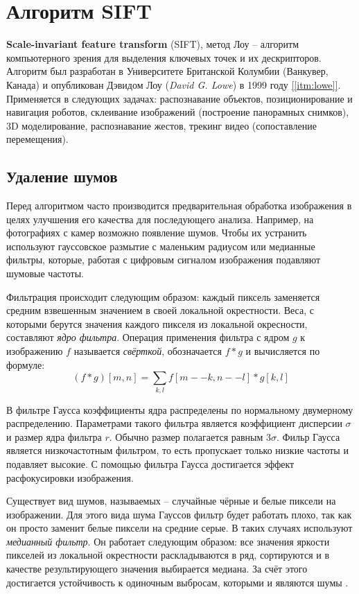 \section{Алгоритм SIFT}

\textbf{Scale-invariant feature transform} (SIFT), метод Лоу -- алгоритм компьютерного зрения для выделения ключевых точек и их дескрипторов. Алгоритм был разработан в Университете Британской Колумбии (Ванкувер, Канада) и опубликован Дэвидом Лоу (\textit{David G. Lowe}) в 1999 году \hyperref[itm:lowe]{[\ref{itm:lowe}]}. Применяется в следующих задачах: распознавание объектов, позиционирование и навигация роботов, склеивание изображений (построение панорамных снимков), 3D моделирование, распознавание жестов, трекинг видео (сопоставление перемещения).

\subsection{Удаление шумов}

Перед алгоритмом часто производится предварительная обработка изображения в целях улучшения его качества для последующего анализа. Например, на фотографиях с камер возможно появление шумов. Чтобы их устранить используют гауссовское размытие с маленьким радиусом или медианные фильтры, которые, работая с цифровым сигналом изображения подавляют шумовые частоты.

Фильтрация происходит следующим образом: каждый пиксель заменяется средним взвешенным значением в своей локальной окрестности. Веса, с которыми берутся значения каждого пикселя из локальной окресности, составляют \textit{ядро фильтра}. Операция применения фильтра с ядром $g$ к изображению $f$ называется \textit{свёрткой}, обозначается $f * g$ и вычисляется по формуле:
\begin{equation}
    (f * g)[m, n] = \sum_{k, l} f[m -- k, n -- l] * g[k, l]
\end{equation}

В фильтре Гаусса коэффициенты ядра распределены по нормальному двумерному распределению. Параметрами такого фильтра является коэффициент дисперсии $\sigma$ и размер ядра фильтра $r$. Обычно размер полагается равным $3\sigma$. Фильр Гаусса является низкочастотным фильтром, то есть пропускает только низкие частоты и подавляет высокие. С помощью фильтра Гаусса достигается эффект расфокусировки изображения.

Существует вид шумов, называемых  -- случайные чёрные и белые пиксели на изображении. Для этого вида шума Гауссов фильтр будет работать плохо, так как он просто заменит белые пиксели на средние серые. В таких случаях используют \textit{медианный фильтр}. Он работает следующим образом: все значения яркости пикселей из локальной окрестности раскладываются в ряд, сортируются и в качестве результирующего значения выбирается медиана. За счёт этого достигается устойчивость к одиночным выбросам, которыми и являются шумы .

